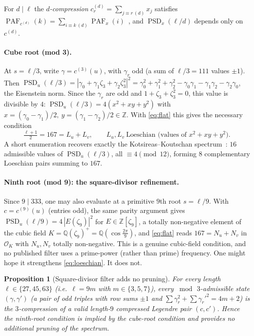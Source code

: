 \documentclass[11pt]{article}
\newtheorem{proposition}{Proposition}
\theoremstyle{definition}
\DeclareMathOperator{\PAF}{PAF}
\DeclareMathOperator{\PSD}{PSD}
\newcommand{\Z}{\mathbb{Z}}
\newcommand{\Q}{\mathbb{Q}}
\begin{document}
For $d\mid\ell$ the \emph{$d$-compression} $c^{(d)}_r=\sum_{j\equiv r\ (d)}x_j$ satisfies
$\PAF_{c^{(d)}}(k)=\sum_{i\equiv k\ (d)}\PAF_x(i)$~\cite{dk-compress}, and $\PSD_x(\ell/d)$ depends only on
$c^{(d)}$.

\paragraph{Cube root (mod 3).} At $s=\ell/3$, write $\gamma=c^{(3)}(u)$, with $\gamma_r$ odd (a sum of
$\ell/3=111$ values $\pm1$). Then $\PSD_u(\ell/3)=|\gamma_0+\gamma_1\zeta_3+\gamma_2\zeta_3^2|^2
=\gamma_0^2+\gamma_1^2+\gamma_2^2-\gamma_0\gamma_1-\gamma_1\gamma_2-\gamma_2\gamma_0$, the Eisenstein norm.
Since the $\gamma_r$ are odd and $1+\zeta_3+\zeta_3^2=0$, this value is divisible by $4$:
$\PSD_u(\ell/3)=4(x^2+xy+y^2)$ with $x=(\gamma_0-\gamma_1)/2,\ y=(\gamma_1-\gamma_2)/2\in\Z$. With
\eqref{eq:flat} this gives the necessary condition
\begin{equation}\label{eq:loeschian}
\tfrac{\ell+1}{2}=167=L_u+L_v,\qquad L_u,L_v\ \text{Loeschian (values of }x^2+xy+y^2).
\end{equation}
A short enumeration recovers exactly the Kotsireas--Koutschan spectrum~\cite{kk-mod3}: $16$ admissible
values of $\PSD_u(\ell/3)$, all $\equiv 4\pmod{12}$, forming $8$ complementary Loeschian pairs summing to
$167$.

\paragraph{Ninth root (mod 9): the square-divisor refinement.} Since $9\mid 333$, one may also evaluate at
a primitive $9$th root $s=\ell/9$. With $c=c^{(9)}(u)$ (entries odd), the same parity argument gives
$\PSD_u(\ell/9)=4\,|E(\zeta_9)|^2$ for $E\in\Z[\zeta_9]$, a totally non-negative element of the cubic field
$K=\Q(\zeta_9)^+=\Q(\cos\tfrac{2\pi}{9})$, and \eqref{eq:flat} reads $167=N_u+N_v$ in $\mathcal O_K$ with
$N_u,N_v$ totally non-negative. This is a genuine cubic-field condition, and no published filter uses a
prime-power (rather than prime) frequency. One might hope it strengthens \eqref{eq:loeschian}. It does not.

\begin{proposition}[Square-divisor filter adds no pruning]\label{prop:ninth}
For every length $\ell\in\{27,45,63\}$ (i.e.\ $\ell=9m$ with $m\in\{3,5,7\}$), every $\bmod\,3$-admissible
state $(\gamma,\gamma')$ (a pair of odd triples with row sums $\pm1$ and
$\sum\gamma_r^2+\sum\gamma_r'^2=4m+2$) is the $3$-compression of a valid length-$9$ compressed Legendre
pair $(c,c')$. Hence the ninth-root condition is implied by the cube-root condition and provides no
additional pruning of the spectrum.
\end{proposition}
\end{document}
